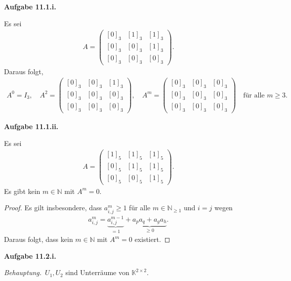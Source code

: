 \documentclass[12pt]{extarticle}
\newcommand{\mg}[1]{\mathbb{#1}}
\newcommand{\aufgn}[1]{\textbf{Aufgabe #1.}}
\newcommand{\beh}{\textit{Behauptung.}\ }
\begin{document}
\aufgn{11.1.i}

Es sei
\begin{align*}
  A =
\begin{pmatrix}
  [0]_3 & [1]_3 & [1]_3 \\
  [0]_3 & [0]_3 & [1]_3 \\
  [0]_3 & [0]_3 & [0]_3
\end{pmatrix}.
\end{align*}
Daraus folgt,
\begin{align*}
  A^0 = I_3, \quad
A^2 =
\begin{pmatrix}
  [0]_3 & [0]_3 & [1]_3 \\
  [0]_3 & [0]_3 & [0]_3 \\
  [0]_3 & [0]_3 & [0]_3
\end{pmatrix}, \quad
A^m =
\begin{pmatrix}
  [0]_3 & [0]_3 & [0]_3 \\
  [0]_3 & [0]_3 & [0]_3 \\
  [0]_3 & [0]_3 & [0]_3
\end{pmatrix} \quad \text{für alle } m \ge 3.
\end{align*}

\aufgn{11.1.ii}

Es sei
\begin{align*}
  A =
\begin{pmatrix}
  [1]_5 & [1]_5 & [1]_5 \\
  [0]_5 & [1]_5 & [1]_5 \\
  [0]_5 & [0]_5 & [1]_5
\end{pmatrix}.
\end{align*}
Es gibt kein \(m \in \mg{N}\) mit \(A^m = 0\).
\begin{proof}
Es gilt insbesondere, dass \(a_{i,j}^m \ge 1\) für alle $m
\in \mg{N}_{\ge 1}$ und \(i = j\) wegen
\begin{align*}
a_{i,j}^m = \underbrace{a_{i,j}^{m-1}}_{=1} +
  \underbrace{a_p a_q + a_g a_h}_{\ge 0}.
\end{align*}
Daraus folgt, dass kein \(m \in \mg{N}\) mit \(A^m = 0\) existiert.
\end{proof}

\aufgn{11.2.i}

\beh \(U_1, U_2\) sind Unterräume von
\(\mg{K}^{2 \times 2}\).
\end{document}
